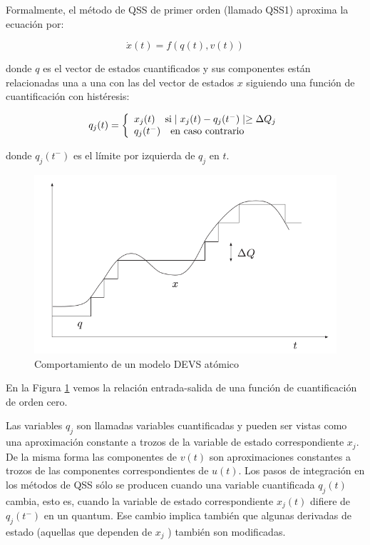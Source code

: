 	Formalmente, el método de QSS de primer orden (llamado QSS1) aproxima la ecuación por:
	
	\begin{equation}
	\dot{x}(t) = f (q(t), v(t))
	\end{equation}
	
	donde $q$ es el vector de estados cuantificados y sus componentes están relacionadas una a una con las del vector de estados $x$ siguiendo una 
	función de cuantificación con histéresis:
	
	\begin{equation}
	q_j(t) = \left\{ 
	  \begin{array}{l l}
	    x_j(t)  \quad \text{si} \mid x_j (t ) - q_j (t^{-} ) \mid \geq \Delta Q_j \\
	    q_j (t^{-} ) \quad \text{en caso contrario}
	  \end{array} \right.
	\end{equation}
	
	donde $q_j (t^{-})$ es el límite por izquierda de $q_j$ en $t$.
	
	\begin{figure}[!htbp]
	  \includegraphics[scale=0.5]{histeresis1}
	  \caption{Comportamiento de un modelo DEVS atómico}
	   \label{fig:fig2-2}
	\end{figure}
	
	En la Figura \ref{fig:fig2-2} vemos la relación entrada-salida de una función de cuantificación de orden cero.
	
	Las variables $q_j$ son llamadas variables cuantificadas y pueden ser vistas como una aproximación constante a trozos de la variable de estado 
	correspondiente $x_j$. De la misma forma las componentes de $v(t)$ son aproximaciones constantes a trozos de las componentes correspondientes de $u(t)$. 
	Los pasos de integración en los métodos de QSS sólo se producen cuando una variable cuantificada $q_j (t)$ cambia, esto es, cuando la variable de 
	estado correspondiente $x_j (t)$ difiere de $q_j(t^{-})$ en un quantum. Ese cambio implica también que algunas derivadas de estado (aquellas que 
	dependen de $x_j$ ) también son modificadas. 


